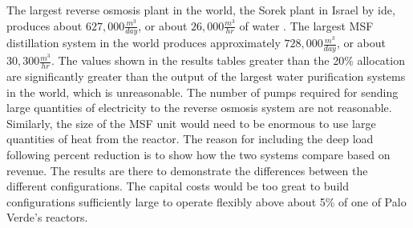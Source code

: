 The largest reverse osmosis plant in the world, the Sorek plant in Israel by \ac{ide}, produces about $627,000 \frac{m^3}{day}$, or about $26,000\frac{m^3}{hr}$ of water \cite{Talbot2015}. The largest MSF distillation system in the world produces approximately $728,000\frac{m^3}{day}$, or about $30,300\frac{m^3}{hr}$.  The values shown in the results tables greater than the 20\% allocation are significantly greater than the output of the largest water purification systems in the world, which is unreasonable. The number of pumps required for sending large quantities of electricity to the reverse osmosis system are not reasonable. Similarly, the size of the MSF unit would need to be enormous to use large quantities of heat from the reactor.  The reason for including the deep load following percent reduction is to show how the two systems compare based on revenue. The results are there to demonstrate the differences between the different configurations. The capital costs would be too great to build configurations sufficiently large to operate flexibly above about 5\% of one of Palo Verde's reactors.

